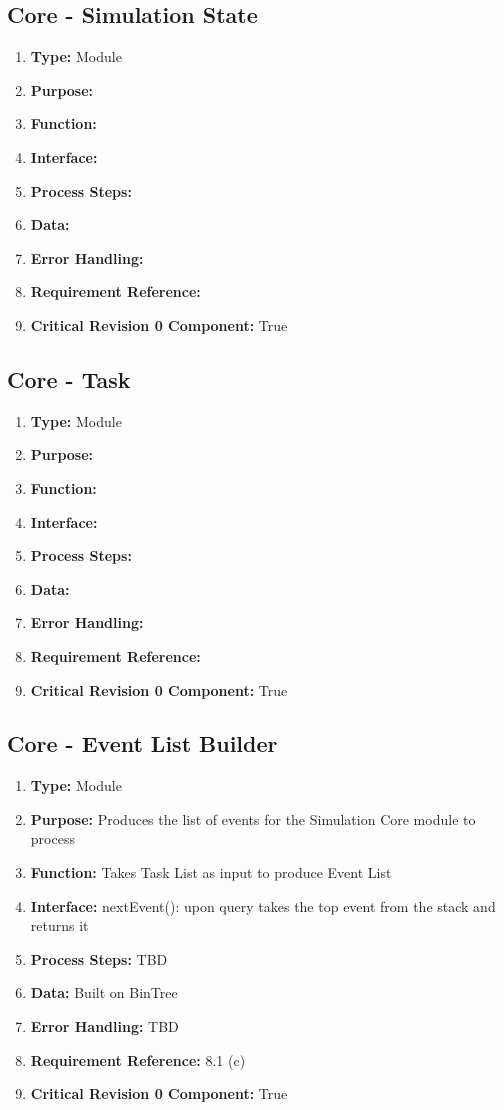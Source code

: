 \documentclass[paper=letter, fontsize=10pt]{scrartcl}
\numberwithin{equation}{section}		%
\numberwithin{figure}{section}			%
\numberwithin{table}{section}				%
\begin{document}
\subsection{Core - Simulation State}
\begin{enumerate}[]
	\item \textbf{Type:} Module
	\item \textbf{Purpose:} 
	\item \textbf{Function:} 
	\item \textbf{Interface:}
	\item \textbf{Process Steps:} 
	\item \textbf{Data:}
	\item \textbf{Error Handling:}
	\item \textbf{Requirement Reference:}
	\item \textbf{Critical Revision 0 Component:} True
\end{enumerate}
\subsection{Core - Task}
\begin{enumerate}[]
	\item \textbf{Type:} Module
	\item \textbf{Purpose:} 
	\item \textbf{Function:} 
	\item \textbf{Interface:}
	\item \textbf{Process Steps:} 
	\item \textbf{Data:}
	\item \textbf{Error Handling:}
	\item \textbf{Requirement Reference:}
	\item \textbf{Critical Revision 0 Component:} True
\end{enumerate}
\subsection{Core - Event List Builder}
\begin{enumerate}[]
	\item \textbf{Type:} Module
	\item \textbf{Purpose:} Produces the list of events for the Simulation Core module to process
	\item \textbf{Function:} Takes Task List as input to produce Event List
	\item \textbf{Interface:} nextEvent(): upon query takes the top event from the stack and returns it
	\item \textbf{Process Steps:} TBD
	\item \textbf{Data:} Built on BinTree
	\item \textbf{Error Handling:} TBD
	\item \textbf{Requirement Reference:} 8.1 (c)
	\item \textbf{Critical Revision 0 Component:} True
\end{enumerate}
\end{document}
